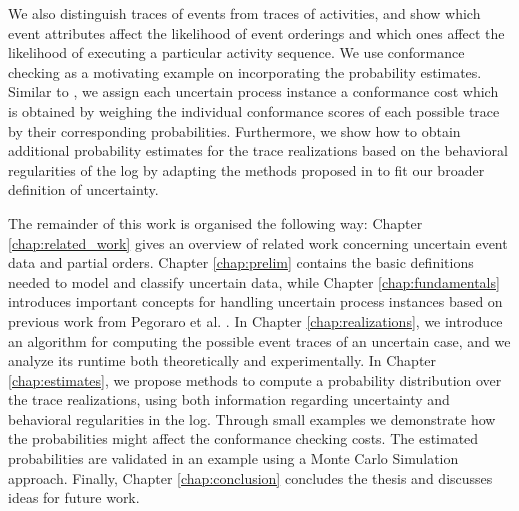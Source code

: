 We also distinguish traces of events from traces of activities, and show which event attributes affect the likelihood of event orderings and which ones affect the likelihood of executing a particular activity sequence.
We use conformance checking as a motivating example on incorporating the probability estimates.
Similar to \cite{por}, we assign each uncertain process instance a conformance cost which is obtained by weighing the individual conformance scores of each possible trace by their corresponding probabilities.
Furthermore, we show how to obtain additional probability estimates for the trace realizations based on the behavioral regularities of the log by adapting the methods proposed in \cite{por} to fit our broader definition of uncertainty.

The remainder of this work is organised the following way: Chapter \ref{chap:related_work} gives an overview of related work concerning uncertain event data and partial orders.
Chapter \ref{chap:prelim} contains the basic definitions needed to model and classify uncertain data, while Chapter \ref{chap:fundamentals} introduces important concepts for handling uncertain process instances based on previous work from Pegoraro et al. \citep{mining,discovery,efficient,conformance}.
In Chapter \ref{chap:realizations}, we introduce an algorithm for computing the possible event traces of an uncertain case, and we analyze its runtime both theoretically and experimentally.
In Chapter \ref{chap:estimates}, we propose methods to compute a probability distribution over the trace realizations, using both information regarding uncertainty and behavioral regularities in the log.
Through small examples we demonstrate how the probabilities might affect the conformance checking costs.
The estimated probabilities are validated in an example using a Monte Carlo Simulation approach.  
Finally, Chapter \ref{chap:conclusion} concludes the thesis and discusses ideas for future work.




%
%
%
%
%
%
%
